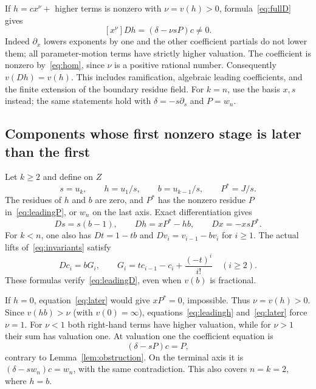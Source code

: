 \documentclass[11pt]{article}
\theoremstyle{remark}\newtheorem{remark}[theorem]{Remark}
\begin{document}
If $h=cx^\nu+$ higher terms is nonzero with $\nu=v(h)>0$, formula~\eqref{eq:fullD} gives
\begin{equation}\label{eq:leadingh}
 [x^\nu]Dh=(\delta-\nu sP)c\ne0.
\end{equation}
Indeed $\partial_x$ lowers exponents by one and the other coefficient partials do not lower them; all parameter-motion terms have strictly higher valuation. The coefficient is nonzero by~\eqref{eq:hom}, since $\nu$ is a positive rational number. Consequently $v(Dh)=v(h)$. This includes ramification, algebraic leading coefficients, and the finite extension of the boundary residue field. For $k=n$, use the basis $x,s$ instead; the same statements hold with $\delta=-s\partial_s$ and $P=w_n$.

\subsection{Components whose first nonzero stage is later than the first}
Let $k\geq2$ and define on $Z$
\[
 s=u_k,\qquad h=u_1/s,\qquad b=u_{k-1}/s,\qquad P^*=J/s.
\]
The residues of $h$ and $b$ are zero, and $P^*$ has the nonzero residue $P$ in~\eqref{eq:leadingP}, or $w_n$ on the last axis. Exact differentiation gives
\begin{equation}\label{eq:later}
 Ds=s(b-1),\qquad Dh=xP^*-hb,\qquad Dx=-xsP^*.
\end{equation}
For $k<n$, one also has $Dt=1-tb$ and $Dv_i=v_{i-1}-bv_i$ for $i\geq1$. The actual lifts of~\eqref{eq:invariants} satisfy
\begin{equation}\label{eq:laterc}
 Dc_i=bG_i,\qquad G_i=t c_{i-1}-c_i+\frac{(-t)^i}{i!}\quad(i\geq2).
\end{equation}
These formulas verify~\eqref{eq:leadingD}, even when $v(b)$ is fractional.

If $h=0$, equation~\eqref{eq:later} would give $xP^*=0$, impossible. Thus $\nu=v(h)>0$. Since $v(hb)>\nu$ (with $v(0)=\infty$), equations~\eqref{eq:leadingh} and~\eqref{eq:later} force $\nu=1$. For $\nu<1$ both right-hand terms have higher valuation, while for $\nu>1$ their sum has valuation one. At valuation one the coefficient equation is
\[
 (\delta-sP)c=P,
\]
contrary to Lemma~\ref{lem:obstruction}. On the terminal axis it is $(\delta-sw_n)c=w_n$, with the same contradiction. This also covers $n=k=2$, where $h=b$.
\end{document}
